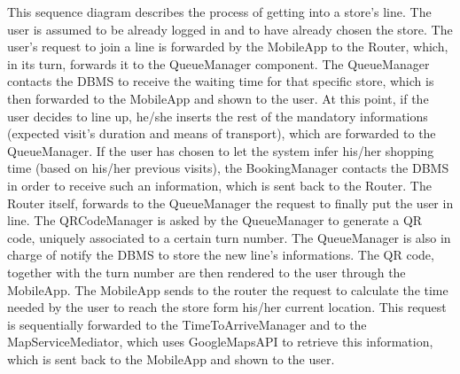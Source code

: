 \documentclass{article}
\begin{document}
This sequence diagram describes the process of getting into a store’s line. The user is assumed to be already logged in and to have already chosen the store. The user’s request to join a line is forwarded by the MobileApp to the Router, which, in its turn, forwards it to the QueueManager component. The QueueManager contacts the DBMS to receive the waiting time for that specific store, which is then forwarded to the MobileApp and shown to the user. At this point, if the user decides to line up, he/she inserts the rest of the mandatory informations (expected visit’s duration and means of transport), which are forwarded to the QueueManager. If the user has chosen to let the system infer his/her shopping time (based on his/her previous visits), the BookingManager contacts the DBMS in order to receive such an information, which is sent back to the Router. The Router itself, forwards to the QueueManager the request to finally put the user in line. The QRCodeManager is asked by the QueueManager to generate a QR code, uniquely associated to a certain turn number. The QueueManager is also in charge of notify the DBMS to store the new line’s informations. The QR code, together with the turn number are then rendered to the user through the MobileApp. The MobileApp sends to the router the request to calculate the time needed by the user to reach the store form his/her current location. This request is sequentially forwarded to the TimeToArriveManager and to the MapServiceMediator, which uses GoogleMapsAPI to retrieve this information, which is sent back to the MobileApp and shown to the user.
\end{document}
